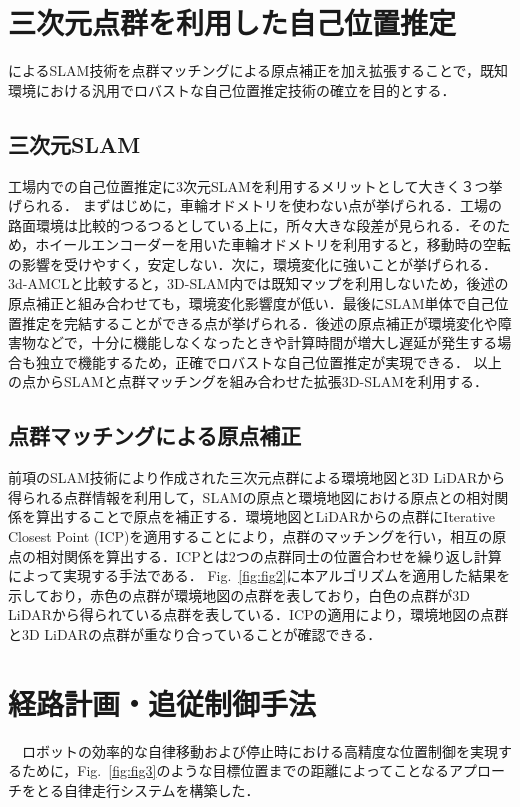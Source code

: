 \section{三次元点群を利用した自己位置推定}
\cite{FAST-LIO, FAST-LIO2}によるSLAM技術を点群マッチングによる原点補正を加え拡張することで，既知環境における汎用でロバストな自己位置推定技術の確立を目的とする．

\subsection{三次元SLAM}
工場内での自己位置推定に3次元SLAMを利用するメリットとして大きく３つ挙げられる．
まずはじめに，車輪オドメトリを使わない点が挙げられる．工場の路面環境は比較的つるつるとしている上に，所々大きな段差が見られる．そのため，ホイールエンコーダーを用いた車輪オドメトリを利用すると，移動時の空転の影響を受けやすく，安定しない．次に，環境変化に強いことが挙げられる．3d-AMCLと比較すると，3D-SLAM内では既知マップを利用しないため，後述の原点補正と組み合わせても，環境変化影響度が低い．最後にSLAM単体で自己位置推定を完結することができる点が挙げられる．後述の原点補正が環境変化や障害物などで，十分に機能しなくなったときや計算時間が増大し遅延が発生する場合も独立で機能するため，正確でロバストな自己位置推定が実現できる．
以上の点からSLAMと点群マッチングを組み合わせた拡張3D-SLAMを利用する．

\subsection{点群マッチングによる原点補正}
前項のSLAM技術により作成された三次元点群による環境地図と3D LiDARから得られる点群情報を利用して，SLAMの原点と環境地図における原点との相対関係を算出することで原点を補正する．環境地図とLiDARからの点群にIterative Closest Point (ICP)\cite{ICP}を適用することにより，点群のマッチングを行い，相互の原点の相対関係を算出する．ICPとは2つの点群同士の位置合わせを繰り返し計算によって実現する手法である．
Fig.~\ref{fig:fig2}に本アルゴリズムを適用した結果を示しており，赤色の点群が環境地図の点群を表しており，白色の点群が3D LiDARから得られている点群を表している．ICPの適用により，環境地図の点群と3D LiDARの点群が重なり合っていることが確認できる．

\section{経路計画・追従制御手法}
　ロボットの効率的な自律移動および停止時における高精度な位置制御を実現するために，Fig.~\ref{fig:fig3}のような目標位置までの距離によってことなるアプローチをとる自律走行システムを構築した．

